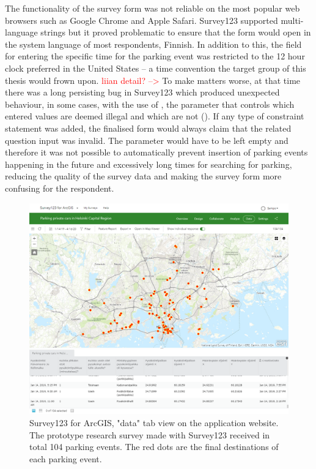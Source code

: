 The functionality of the survey form was not reliable on the most popular web browsers such as Google Chrome and Apple Safari. Survey123 supported multi-language strings but it proved problematic to ensure that the form would open in the system language of most respondents, Finnish. In addition to this, the field for entering the specific time for the parking event was restricted to the 12 hour clock preferred in the United States -- a time convention the target group of this thesis would frown upon. \textcolor{red}{liian detail? --> }To make matters worse, at that time there was a long persisting bug in Survey123 which produced unexpected behaviour, in some cases, with the use of , the parameter that controls which entered values are deemed illegal and which are not (\cite{GeoNet-TheEsriCommunity2018}). If any type of constraint statement was added, the finalised form would always claim that the related question input was invalid. The parameter would have to be left empty and therefore it was not possible to automatically prevent insertion of parking events happening in the future and excessively long times for searching for parking, reducing the quality of the survey data and making the survey form more confusing for the respondent.

\begin{figure}[H]%
    \includegraphics[width=\textwidth]{images/survey123_dataview.png}
    \caption[The Survey123 web application dashboard]{Survey123 for ArcGIS, "data" tab view on the application website. The prototype research survey made with Survey123 received in total 104 parking events. The red dots are the final destinations of each parking event.}%
    \label{fig:survey123_dataview}%
\end{figure}

